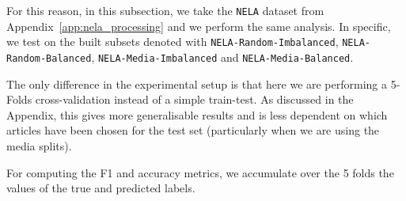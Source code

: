 For this reason, in this subsection, we take the \texttt{NELA} dataset from Appendix~\ref{app:nela_processing} and we perform the same analysis. In specific, we test on the built subsets denoted with \texttt{NELA-Random-Imbalanced}, \texttt{NELA-Random-Balanced}, \texttt{NELA-Media-Imbalanced} and \texttt{NELA-Media-Balanced}.


The only difference in the experimental setup is that here we are performing a 5-Folds cross-validation instead of a simple train-test.
As discussed in the Appendix, this gives more generalisable results and is less dependent on which articles have been chosen for the test set (particularly when we are using the media splits).

For computing the F1 and accuracy metrics, we accumulate over the 5 folds the values of the true and predicted labels.

